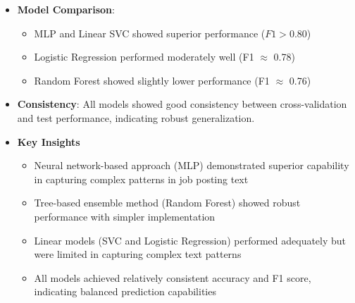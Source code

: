 \documentclass[9pt]{article}
\begin{document}
\begin{enumerate}
\begin{itemize}
      \item \textbf{Model Comparison}:
      \begin{itemize}
          \item MLP and Linear SVC showed superior performance ($F1 > 0.80$)
          \item Logistic Regression performed moderately well (F1 $\approx$ 0.78)
          \item Random Forest showed slightly lower performance (F1 $\approx$ 0.76)
      \end{itemize}
      \item \textbf{Consistency}: All models showed good consistency between cross-validation and test performance, indicating robust generalization.
      \item \textbf{Key Insights}
      \begin{itemize}
        \item Neural network-based approach (MLP) demonstrated superior capability in capturing complex patterns in job posting text
        \item Tree-based ensemble method (Random Forest) showed robust performance with simpler implementation
        \item Linear models (SVC and Logistic Regression) performed adequately but were limited in capturing complex text patterns
        \item All models achieved relatively consistent accuracy and F1 score, indicating balanced prediction capabilities
      \end{itemize}
    \end{itemize} 
\end{enumerate}
\end{document}
